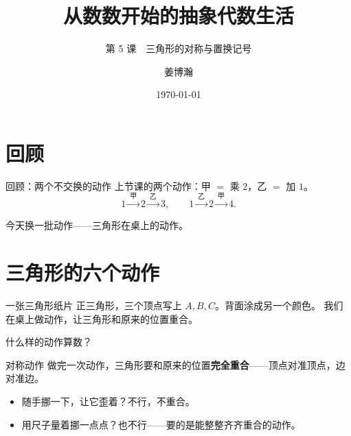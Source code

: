 \documentclass[10pt]{beamer}
\title{从数数开始的抽象代数生活}
\subtitle{第 5 课　三角形的对称与置换记号}
\author{姜博瀚}
\institute{厦门大学附属实验中学}
\date{\today}
\begin{document}
\begin{frame}
  \titlepage
\end{frame}

\section{回顾}

\begin{frame}{回顾：两个不交换的动作}
  上节课的两个动作：\quad 甲 \(=\) 乘 \(2\)，\quad 乙 \(=\) 加 \(1\)。
  \[
    1 \xrightarrow{\ \text{甲}\ } 2 \xrightarrow{\ \text{乙}\ } 3,
    \qquad
    1 \xrightarrow{\ \text{乙}\ } 2 \xrightarrow{\ \text{甲}\ } 4 .
  \]
  \pause
  \begin{center}
    {\large 今天换一批动作——三角形在桌上的动作。}
  \end{center}
\end{frame}

\section{三角形的六个动作}

\begin{frame}{一张三角形纸片}
  正三角形，三个顶点写上 \(A,B,C\)。\quad 背面涂成另一个颜色。
  我们在桌上做动作，让三角形和原来的位置重合。
\end{frame}

\begin{frame}{什么样的动作算数？}
  \begin{block}{对称动作}
    做完一次动作，三角形要和原来的位置\textbf{完全重合}——顶点对准顶点，边对准边。
  \end{block}
  \pause
  \begin{itemize}
    \item 随手挪一下，让它歪着？不行，不重合。
    \item 用尺子量着挪一点点？也不行——要的是能整整齐齐重合的动作。
  \end{itemize}
\end{frame}
\end{document}
